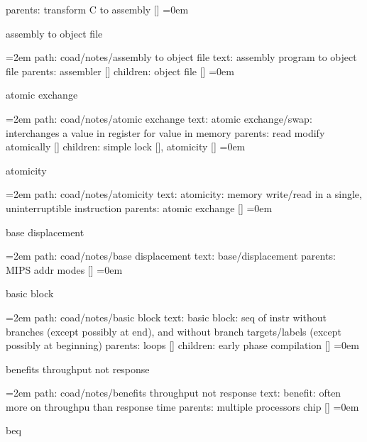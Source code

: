 \smallskip
parents:  transform C to assembly []
\smallskip
\leftskip=0em
\par\endgroup
\bigskip
{}
assembly to object file
\smallskip
\par\begingroup
\leftskip=2em
path: coad/notes/assembly to object file
\smallskip
text:  assembly program to object file
\smallskip
parents:  assembler []
\smallskip
children: object file []
\smallskip
\leftskip=0em
\par\endgroup
\bigskip
{}
atomic exchange
\smallskip
\par\begingroup
\leftskip=2em
path: coad/notes/atomic exchange
\smallskip
text:  atomic exchange/swap: interchanges a value in register for value in memory
\smallskip
parents:  read modify atomically []
\smallskip
children: simple lock [], atomicity []
\smallskip
\leftskip=0em
\par\endgroup
\bigskip
{}
atomicity
\smallskip
\par\begingroup
\leftskip=2em
path: coad/notes/atomicity
\smallskip
text:  atomicity: memory write/read in a single, uninterruptible instruction
\smallskip
parents:  atomic exchange []
\smallskip
\leftskip=0em
\par\endgroup
\bigskip
{}
base displacement
\smallskip
\par\begingroup
\leftskip=2em
path: coad/notes/base displacement
\smallskip
text:  base/displacement
\smallskip
parents:  MIPS addr modes []
\smallskip
\leftskip=0em
\par\endgroup
\bigskip
{}
basic block
\smallskip
\par\begingroup
\leftskip=2em
path: coad/notes/basic block
\smallskip
text:  basic block: seq of instr without branches (except possibly at end), and without branch targets/labels (except possibly at beginning)
\smallskip
parents:  loops []
\smallskip
children: early phase compilation []
\smallskip
\leftskip=0em
\par\endgroup
\bigskip
{}
benefits throughput not response
\smallskip
\par\begingroup
\leftskip=2em
path: coad/notes/benefits throughput not response
\smallskip
text:  benefit: often more on throughpu than response time
\smallskip
parents:  multiple processors chip []
\smallskip
\leftskip=0em
\par\endgroup
\bigskip
{}
beq
\smallskip
\par\begingroup
